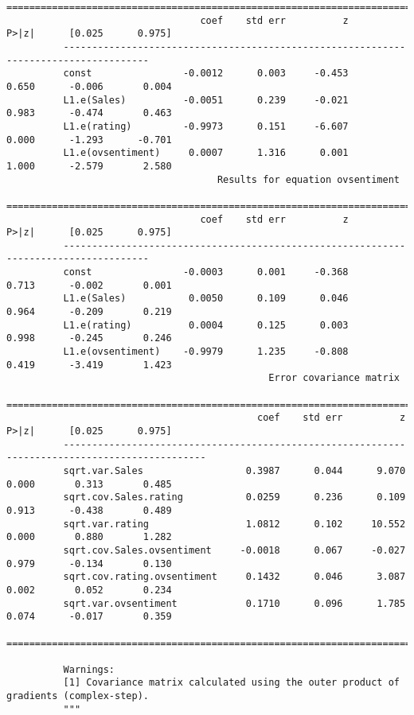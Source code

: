 \documentclass[11pt]{article}
\begin{document}
\begin{Verbatim}[commandchars=\\\{\}]
          =====================================================================================
                                  coef    std err          z      P>|z|      [0.025      0.975]
          -------------------------------------------------------------------------------------
          const                -0.0012      0.003     -0.453      0.650      -0.006       0.004
          L1.e(Sales)          -0.0051      0.239     -0.021      0.983      -0.474       0.463
          L1.e(rating)         -0.9973      0.151     -6.607      0.000      -1.293      -0.701
          L1.e(ovsentiment)     0.0007      1.316      0.001      1.000      -2.579       2.580
                                     Results for equation ovsentiment                          
          =====================================================================================
                                  coef    std err          z      P>|z|      [0.025      0.975]
          -------------------------------------------------------------------------------------
          const                -0.0003      0.001     -0.368      0.713      -0.002       0.001
          L1.e(Sales)           0.0050      0.109      0.046      0.964      -0.209       0.219
          L1.e(rating)          0.0004      0.125      0.003      0.998      -0.245       0.246
          L1.e(ovsentiment)    -0.9979      1.235     -0.808      0.419      -3.419       1.423
                                              Error covariance matrix                                    
          ===============================================================================================
                                            coef    std err          z      P>|z|      [0.025      0.975]
          -----------------------------------------------------------------------------------------------
          sqrt.var.Sales                  0.3987      0.044      9.070      0.000       0.313       0.485
          sqrt.cov.Sales.rating           0.0259      0.236      0.109      0.913      -0.438       0.489
          sqrt.var.rating                 1.0812      0.102     10.552      0.000       0.880       1.282
          sqrt.cov.Sales.ovsentiment     -0.0018      0.067     -0.027      0.979      -0.134       0.130
          sqrt.cov.rating.ovsentiment     0.1432      0.046      3.087      0.002       0.052       0.234
          sqrt.var.ovsentiment            0.1710      0.096      1.785      0.074      -0.017       0.359
          ===============================================================================================
          
          Warnings:
          [1] Covariance matrix calculated using the outer product of gradients (complex-step).
          """
\end{Verbatim}
            
\end{document}
